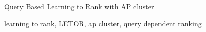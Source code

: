 \documentclass{article}
\begin{document}

Query Based Learning to Rank with AP cluster

learning to rank, LETOR, ap cluster, query dependent ranking






\end{document}
